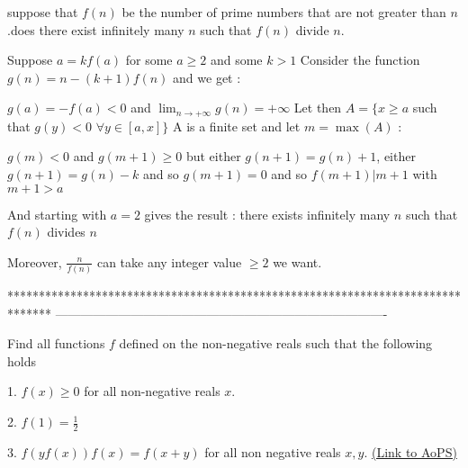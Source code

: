 \begin{solution}
	\begin{tcolorbox}suppose that $f(n)$ be the number of prime numbers that are not greater than $n$.does there exist infinitely many $n$ such that $f(n)$ divide $n$.\end{tcolorbox}
Suppose $a=kf(a)$ for some $a\ge 2$ and some $k>1$
Consider the function $g(n)=n-(k+1)f(n)$ and we get :

$g(a)=-f(a)<0$ and $\lim_{n\to +\infty}g(n)=+\infty$
Let then $A=\{x\ge a$ such that $g(y)<0$ $\forall y\in[a,x]\}$
A is a finite set and let $m=\max(A)$ :

$g(m)<0$ and $g(m+1)\ge 0$ but either $g(n+1)=g(n)+1$, either $g(n+1)=g(n)-k$ and so $g(m+1)=0$ and so $f(m+1)|m+1$ with $m+1>a$

And starting with $a=2$ gives the result : there exists infinitely many $n$ such that $f(n)$ divides $n$

Moreover, $\frac n{f(n)}$ can take any integer value $\ge 2$ we want.
\end{solution}
*******************************************************************************
-------------------------------------------------------------------------------

\begin{problem}
	Find all functions $f$ defined on the non-negative reals such that the following holds

1. $f(x) \ge 0$ for all non-negative reals $x$.

2. $f(1) = \frac{1}{2}$

3. $f(yf(x))f(x) = f(x+y)$ for all non negative reals $x,y$.
	\flushright \href{https://artofproblemsolving.com/community/c6h475206}{(Link to AoPS)}
\end{problem}




